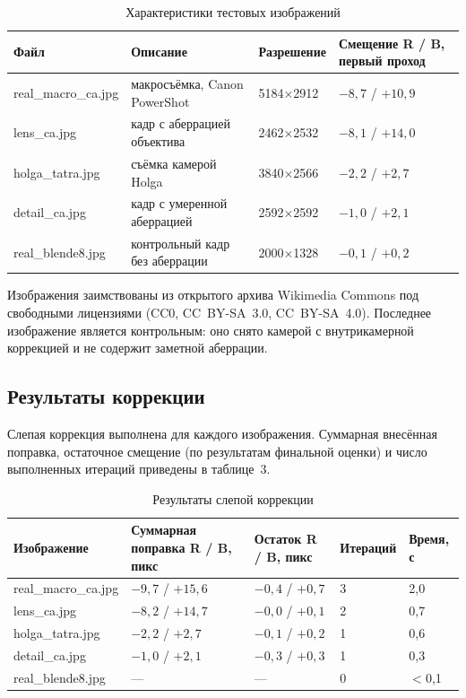 \documentclass[a4paper,14pt,oneside]{extreport}
\begin{document}
\begin{table}[H]
\caption{Характеристики тестовых изображений}
\label{tab:data}
\small
\begin{tabular}{|p{3.2cm}|p{5.2cm}|p{2.2cm}|p{4cm}|}
\hline
Файл & Описание & Разрешение & Смещение R / B, первый проход \\
\hline
real\_macro\_ca.jpg & макросъёмка, Canon PowerShot & 5184$\times$2912 & $-8{,}7$ / $+10{,}9$ \\
\hline
lens\_ca.jpg & кадр с аберрацией объектива & 2462$\times$2532 & $-8{,}1$ / $+14{,}0$ \\
\hline
holga\_tatra.jpg & съёмка камерой Holga & 3840$\times$2566 & $-2{,}2$ / $+2{,}7$ \\
\hline
detail\_ca.jpg & кадр с умеренной аберрацией & 2592$\times$2592 & $-1{,}0$ / $+2{,}1$ \\
\hline
real\_blende8.jpg & контрольный кадр без аберрации & 2000$\times$1328 & $-0{,}1$ / $+0{,}2$ \\
\hline
\end{tabular}
\end{table}

Изображения заимствованы из открытого архива Wikimedia Commons под
свободными лицензиями (CC0, CC~BY-SA~3.0, CC~BY-SA~4.0). Последнее
изображение является контрольным: оно снято камерой с внутрикамерной
коррекцией и не содержит заметной аберрации.

\subsection{Результаты коррекции}

Слепая коррекция выполнена для каждого изображения. Суммарная внесённая
поправка, остаточное смещение (по результатам финальной оценки) и число
выполненных итераций приведены в таблице~3.

\begin{table}[H]
\caption{Результаты слепой коррекции}
\label{tab:results}
\small
\begin{tabular}{|p{3.2cm}|p{3cm}|p{3.4cm}|p{2.1cm}|p{1.8cm}|}
\hline
Изображение & Суммарная поправка R / B, пикс & Остаток R / B, пикс & Итераций & Время, с \\
\hline
real\_macro\_ca.jpg & $-9{,}7$ / $+15{,}6$ & $-0{,}4$ / $+0{,}7$ & 3 & 2,0 \\
\hline
lens\_ca.jpg & $-8{,}2$ / $+14{,}7$ & $-0{,}0$ / $+0{,}1$ & 2 & 0,7 \\
\hline
holga\_tatra.jpg & $-2{,}2$ / $+2{,}7$ & $-0{,}1$ / $+0{,}2$ & 1 & 0,6 \\
\hline
detail\_ca.jpg & $-1{,}0$ / $+2{,}1$ & $-0{,}3$ / $+0{,}3$ & 1 & 0,3 \\
\hline
real\_blende8.jpg & — & — & 0 & $<$0,1 \\
\hline
\end{tabular}
\end{table}
\end{document}
